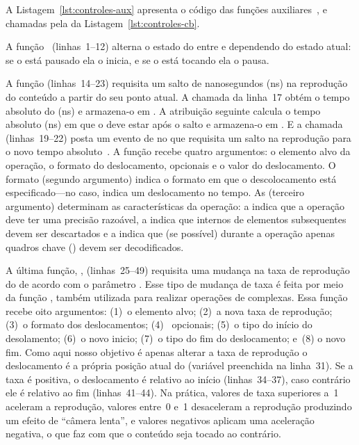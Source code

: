 \documentclass{SBCbookchapter}
\begin{document}


A Listagem~\ref{lst:controles-aux} apresenta o código das funções
auxiliares~,  e~ chamadas pela
  da Listagem~\ref{lst:controles-cb}.

A função~ (linhas~1--12) alterna o estado do 
entre  e  dependendo do estado atual:  se o
 está pausado ela o inicia, e se o  está tocando
ela o pausa.

A função  (linhas~14--23) requisita um salto de 
nanosegundos (ns) na reprodução do conteúdo a partir do seu ponto atual.
A chamada da linha~17 obtém o tempo absoluto do  (ns) e
armazena-o em .  A atribuição seguinte calcula o tempo absoluto (ns)
em que o  deve estar após o salto e armazena-o em .  E a
chamada  (linhas~19--22) posta um evento de
 no  que requisita um salto na reprodução para o novo
tempo absoluto~.  A função  recebe quatro
argumentos: o elemento alvo da operação, o formato do deslocamento,
 opcionais e o valor do deslocamento.  O formato (segundo
argumento) indica o formato em que o descolocamento está especificado---no
caso,  indica um deslocamento no tempo.  As 
(terceiro argumento) determinam as características da operação: a 
 indica que a operação deve ter uma precisão
razoável, a   indica que 
internos de elementos subsequentes devem ser descartados e a 
 indica que (se possível) durante a operação apenas
quadros chave () devem ser decodificados.

A última função, , (linhas~25--49) requisita uma mudança na taxa de
reprodução do  de acordo com o parâmetro .  Esse tipo
de mudança de taxa é feita por meio da função , também
utilizada para realizar operações de  complexas.  Essa função
recebe oito argumentos: (1)~o elemento alvo; (2)~a nova taxa de reprodução;
(3)~o formato dos deslocamentos; (4)~ opcionais; (5)~o tipo do
início do desolamento; (6)~o novo inicio; (7)~o tipo do fim do deslocamento;
e~(8) o novo fim.  Como aqui nosso objetivo é apenas alterar a taxa de
reprodução o deslocamento é a própria posição atual do  (variável
 preenchida na linha~31).  Se a taxa é positiva, o deslocamento é
relativo ao início (linhas~34--37), caso contrário ele é relativo ao fim
(linhas~41--44).  Na prática, valores de taxa superiores a~1 aceleram a
reprodução, valores entre~0 e~1 desaceleram a reprodução produzindo um
efeito de ``câmera lenta'', e valores negativos aplicam uma aceleração
negativa, o que faz com que o conteúdo seja tocado ao contrário.
\end{document}
